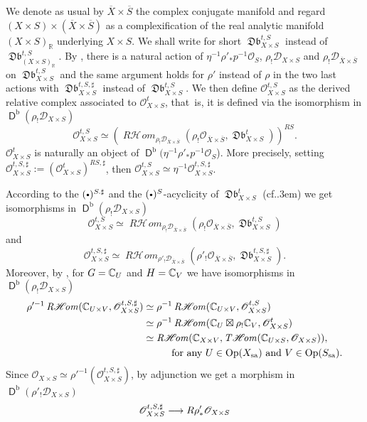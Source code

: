 \documentclass[english]{smfart}
\numberwithin{subsection}{section}
\def\shd{\mathcal{D}}\let\cD\shd
\def\sho{\mathcal{O}}\let\cO\sho
\newcommand{\R}{\mathbb{R}}\let\RR\R
\newcommand{\shhom}{\mathcal{H}\!\mathit{om}}\let\ho\shhom
\DeclareMathOperator{\rh}{\mathit{R}\shhom}
\DeclareMathOperator{\tho}{\mathit{T}\shhom}
\newcommand{\rb}{\mathrm{b}}
\newcommand{\sa}{\mathrm{sa}}
\newcommand{\XS}{X\times S}
\DeclareMathOperator{\rD}{\mathsf{D}}
\DeclareMathOperator{\Db}{\mathfrak{Db}}
\DeclareMathOperator{\Op}{Op}
\def\cf{cf.\kern.3em}
\newcommand{\cbbullet}{{\raisebox{1pt}{$\sbullet$}}}
\newcommand{\sbullet}{{\scriptscriptstyle\bullet}}
\newcommand{\pOS}{p^{-1}\sho_S}
\numberwithin{equation}{section}
\theoremstyle{plain}
\theoremstyle{definition}
\def\to{\mathchoice{\longrightarrow}{\rightarrow}{\rightarrow}{\rightarrow}}
\begin{document}
We denote as usual by $\overline{X}\times \overline{S}$ the complex conjugate manifold and regard \hbox{$(\XS)\times(\overline{X}\times\overline{S})$} as a complexification of the real analytic manifold $(\XS)_{\R}$ underlying $\XS$. We shall write for short $\Db^{t,S}_{\XS}$ instead of $\Db^{t,S}_{(\XS)_{\R}}$. By \hbox{\cite[Lem.\,5.4 and Lem.\,5.5]{MF-P14}}, there is a natural action of $\eta^{-1}\rho'_*\pOS$, $\rho_!\shd_{\XS}$ and $\rho_!\shd_{\overline{X}\times \overline{S}}$ on $\Db^{t,S}_{\XS}$ and the same argument holds for $\rho'$ instead of $\rho$ in the two last actions with $\Db^{t,S,\sharp}_{\XS}$ instead of $\Db^{t,S}_{\XS}$. We then define
$\cO_{\XS}^{t,S}$ as the derived relative complex associated to ${\sho}^t_{\XS}$, that~is, it is defined via the isomorphism in $\rD^\rb(\rho_!\shd_{\XS})$
$$\cO_{\XS}^{t,S} \simeq (\rh_{\rho_!\shd_{\overline{X}\times \overline{S}}}(\rho_!\sho_{\overline{X}\times \overline{S}},{\Db}^t_{\XS}))^{RS}.$$
${\sho}^t_{\XS}$ is naturally an object of $\rD^\rb(\eta^{-1}\rho'_*\pOS$). More precisely, setting
$\cO_{\XS}^{t,S,\sharp}:=(\cO_{\XS}^{t})^{RS,\sharp}$, then $\cO_{\XS}^{t,S}\simeq \eta^{-1} \cO_{\XS}^{t,S,\sharp}$.

According to the $(\cbbullet)^{S.\sharp}$ and the $(\cbbullet)^{S}$-acyclicity of ${\Db}^t_{\XS}$ (\cf \cite[Prop.\,5.2(i)] {MF-P14}) we get isomorphisms in $\rD^\rb(\rho_!\shd_{\XS})$
$$\cO_{\XS}^{t,S} \simeq \rh_{\rho_!\shd_{\overline{X}\times \overline{S}}}(\rho_!\sho_{\overline{X}\times \overline{S}},\Db^{t,S}_{\XS})$$
and
$$\cO_{\XS}^{t,S,\sharp}\simeq \rh_{\rho'_!\shd_{\overline{X}\times \overline{S}}}(\rho'_!\sho_{\overline{X}\times \overline{S}},\Db^{t,S,\sharp}_{\XS}).$$
Moreover, by \cite[Prop.\,4.1\,\&\,5.7] {MF-P14}, for $G=\mathbb{C}_U$ and $H =\mathbb{C}_V$ we have isomorphisms in $\rD^\rb(\rho_!\shd_{\XS})$
\begin{equation}\label{E:ot}
\begin{split}
\rho'^{-1}\rh(\CC_{U\times V},\sho^{t,S,\sharp}_{\XS})
&\simeq \rho^{-1}\rh(\CC_{U\times V}, \cO_{\XS}^{t,S})\\
&\simeq \rho^{-1}\rh(\CC_U \boxtimes \rho_!\CC_V,\sho^{t}_{\XS})\\
&\simeq \rh(\CC_{X\times V}, \tho(\CC_{U \times S},\sho_{\XS})),\\&\hspace*{1cm}\text{for any $U\in\Op(X_\sa)$ and $V\in\Op(S_\sa)$.}
\end{split}
\end{equation}
Since $\sho_{\XS}\simeq \rho'^{-1}(\sho^{t,S,\sharp}_{\XS})$, by adjunction we get a morphism in $\rD^\rb( \rho'_!\shd_{\XS})$
\begin{equation}\label{E:t}
\sho^{t,S,\sharp}_{\XS}\to R\rho'_*\sho_{\XS}
\end{equation}
\end{document}
